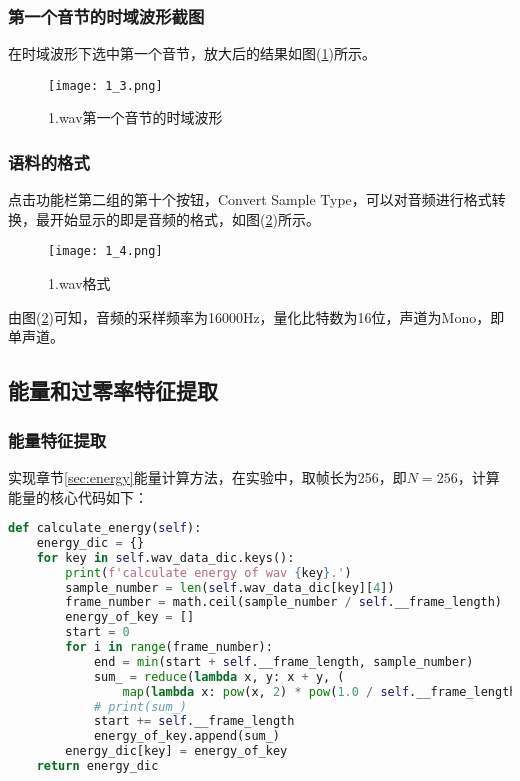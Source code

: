 \documentclass{hitreport}
\begin{document}
\subsubsection{第一个音节的时域波形截图}

在时域波形下选中第一个音节，放大后的结果如图(\ref{fig:firstwav})所示。

\begin{figure}[htb]
	\centering
	\texttt{[image: 1\_3.png]}
	\caption{1.wav第一个音节的时域波形}\label{fig:firstwav}
\end{figure}

\subsubsection{语料的格式}\label{sec:infor}

点击功能栏第二组的第十个按钮，Convert Sample Type，可以对音频进行格式转换，最开始显示的即是音频的格式，如图(\ref{fig:wavtype})所示。

\begin{figure}[htb]
	\centering
	\texttt{[image: 1\_4.png]}
	\caption{1.wav格式}\label{fig:wavtype}
\end{figure}

由图(\ref{fig:wavtype})可知，音频的采样频率为16000Hz，量化比特数为16位，声道为Mono，即单声道。

\subsection{能量和过零率特征提取}\label{sec:sec2}

\subsubsection{能量特征提取}

实现章节\ref{sec:energy}能量计算方法，在实验中，取帧长为256，即$N=256$，计算能量的核心代码如下：
\begin{lstlisting}[language=python]
def calculate_energy(self):
    energy_dic = {}
    for key in self.wav_data_dic.keys():
        print(f'calculate energy of wav {key}.')
        sample_number = len(self.wav_data_dic[key][4])
        frame_number = math.ceil(sample_number / self.__frame_length)
        energy_of_key = []
        start = 0
        for i in range(frame_number):
            end = min(start + self.__frame_length, sample_number)
            sum_ = reduce(lambda x, y: x + y, (
                map(lambda x: pow(x, 2) * pow(1.0 / self.__frame_length, 2), self.wav_data_dic[key][4][start:end])))
            # print(sum_)
            start += self.__frame_length
            energy_of_key.append(sum_)
        energy_dic[key] = energy_of_key
    return energy_dic
\end{lstlisting}
\end{document}

